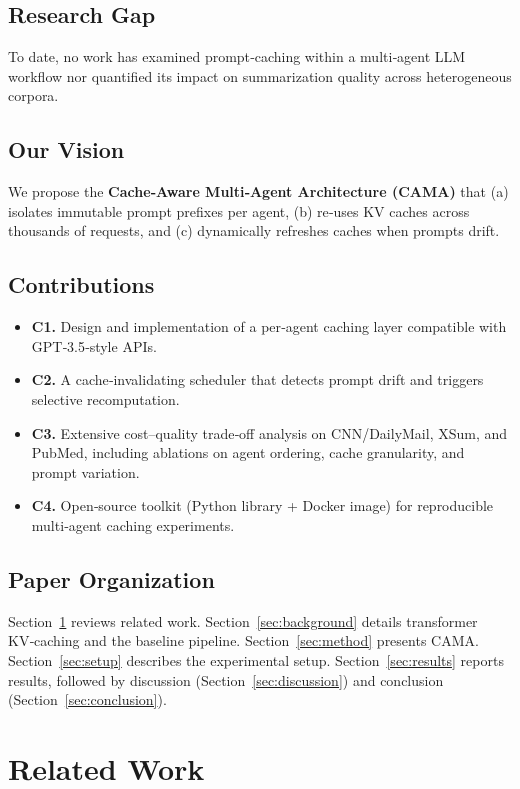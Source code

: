 \documentclass[10pt,conference]{IEEEtran}
\begin{document}
\subsection{Research Gap}
To date, no work has examined prompt‑caching within a multi‑agent LLM workflow nor quantified its impact on summarization quality across heterogeneous corpora.

\subsection{Our Vision}
We propose the \textbf{Cache‑Aware Multi‑Agent Architecture (CAMA)} that (a) isolates immutable prompt prefixes per agent, (b) re‑uses KV caches across thousands of requests, and (c) dynamically refreshes caches when prompts drift.

\subsection{Contributions}
\begin{itemize}[leftmargin=*]
    \item \textbf{C1.} Design and implementation of a per‑agent caching layer compatible with GPT‑3.5‑style APIs.
    \item \textbf{C2.} A cache‑invalidating scheduler that detects prompt drift and triggers selective recomputation.
    \item \textbf{C3.} Extensive cost–quality trade‑off analysis on CNN/DailyMail, XSum, and PubMed, including ablations on agent ordering, cache granularity, and prompt variation.
    \item \textbf{C4.} Open‑source toolkit (Python library + Docker image) for reproducible multi‑agent caching experiments.
\end{itemize}

\subsection{Paper Organization}
Section~\ref{sec:related} reviews related work. Section~\ref{sec:background} details transformer KV‑caching and the baseline pipeline. Section~\ref{sec:method} presents CAMA. Section~\ref{sec:setup} describes the experimental setup. Section~\ref{sec:results} reports results, followed by discussion (Section~\ref{sec:discussion}) and conclusion (Section~\ref{sec:conclusion}).

\section{Related Work}
\label{sec:related}
\end{document}
